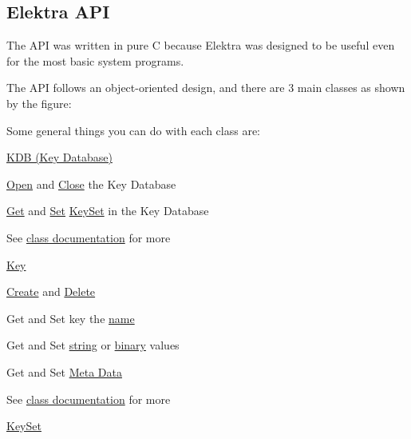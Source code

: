\subsection*{Elektra A\+PI}

The A\+PI was written in pure C because Elektra was designed to be useful even for the most basic system programs.

The A\+PI follows an object-\/oriented design, and there are 3 main classes as shown by the figure\+:

 Some general things you can do with each class are\+:

\hyperlink{group__kdb}{K\+DB (Key Database)}


\begin{DoxyItemize}
\item \hyperlink{group__kdb_ga6808defe5870f328dd17910aacbdc6ca}{Open} and \hyperlink{group__kdb_gadb54dc9fda17ee07deb9444df745c96f}{Close} the Key Database
\item \hyperlink{group__kdb_ga28e385fd9cb7ccfe0b2f1ed2f62453a1}{Get} and \hyperlink{group__kdb_ga11436b058408f83d303ca5e996832bcf}{Set} \hyperlink{group__keyset}{Key\+Set} in the Key Database
\item See \hyperlink{group__kdb}{class documentation} for more
\end{DoxyItemize}

\hyperlink{group__key}{Key}


\begin{DoxyItemize}
\item \hyperlink{group__key_gad23c65b44bf48d773759e1f9a4d43b89}{Create} and \hyperlink{group__key_ga3df95bbc2494e3e6703ece5639be5bb1}{Delete}
\item Get and Set key the \hyperlink{group__keyname_ga7699091610e7f3f43d2949514a4b35d9}{name}
\item Get and Set \hyperlink{group__keyvalue_ga622bde1eb0e0c4994728331326340ef2}{string} or \hyperlink{group__keyvalue_gaa50a5358fd328d373a45f395fa1b99e7}{binary} values
\item Get and Set \hyperlink{group__keymeta}{Meta Data}
\item See \hyperlink{group__key}{class documentation} for more
\end{DoxyItemize}

\hyperlink{group__keyset}{Key\+Set}


